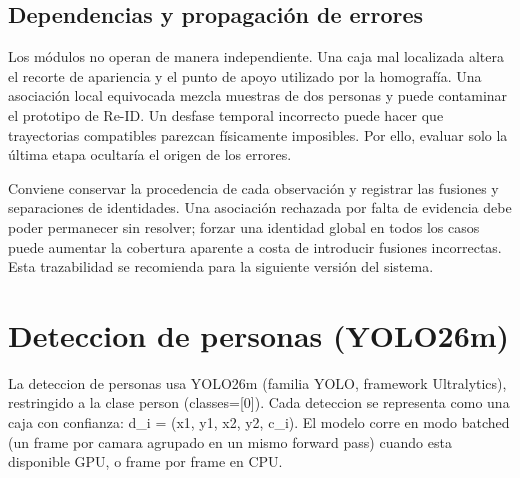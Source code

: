 \documentclass[12pt,letterpaper]{article}
\begin{document}
\subsection{Dependencias y propagación de errores}
Los módulos no operan de manera independiente. Una caja mal localizada altera el recorte de apariencia y el punto de apoyo utilizado por la homografía. Una asociación local equivocada mezcla muestras de dos personas y puede contaminar el prototipo de Re-ID. Un desfase temporal incorrecto puede hacer que trayectorias compatibles parezcan físicamente imposibles. Por ello, evaluar solo la última etapa ocultaría el origen de los errores.

Conviene conservar la procedencia de cada observación y registrar las fusiones y separaciones de identidades. Una asociación rechazada por falta de evidencia debe poder permanecer sin resolver; forzar una identidad global en todos los casos puede aumentar la cobertura aparente a costa de introducir fusiones incorrectas. Esta trazabilidad se recomienda para la siguiente versión del sistema.

\section{Deteccion de personas (YOLO26m)}

La deteccion de personas usa YOLO26m (familia YOLO, framework Ultralytics), restringido a la clase person (classes=[0]). Cada deteccion se representa como una caja con confianza: d\_\allowbreak i = (x1, y1, x2, y2, c\_\allowbreak i). El modelo corre en modo batched (un frame por camara agrupado en un mismo forward pass) cuando esta disponible GPU, o frame por frame en CPU.


\begingroup\small\setlength{\tabcolsep}{4pt}\renewcommand{\arraystretch}{1.2}
\end{document}
